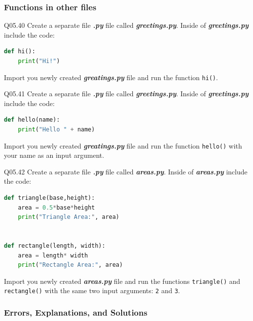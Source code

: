 \documentclass{book}
\newenvironment{problems}{}{}  %
\begin{document}
    
        \begin{problems}
        \subsubsection{Functions in other files}\label{functions-in-other-files}

Q05.40 Create a separate file \textbf{\emph{.py}} file called
\textbf{\emph{greetings.py}}. Inside of \textbf{\emph{greetings.py}}
include the code:

\begin{lstlisting}[language=Python]
def hi():
    print("Hi!")
\end{lstlisting}

Import you newly created \textbf{\emph{greatings.py}} file and run the
function \lstinline!hi()!.

Q05.41 Create a separate file \textbf{\emph{.py}} file called
\textbf{\emph{greetings.py}}. Inside of \textbf{\emph{greetings.py}}
include the code:

\begin{lstlisting}[language=Python]
def hello(name):
    print("Hello " + name)
\end{lstlisting}

Import you newly created \textbf{\emph{greatings.py}} file and run the
function \lstinline!hello()! with your name as an input argument.

Q05.42 Create a separate file \textbf{\emph{.py}} file called
\textbf{\emph{areas.py}}. Inside of \textbf{\emph{areas.py}} include the
code:

\begin{lstlisting}[language=Python]
def triangle(base,height):
    area = 0.5*base*height
    print("Triangle Area:", area)
    

def rectangle(length, width):
    area = length* width
    print("Rectangle Area:", area)
\end{lstlisting}

Import you newly created \textbf{\emph{areas.py}} file and run the
functions \lstinline!triangle()! and \lstinline!rectangle()! with the
same two input arguments: \lstinline!2! and \lstinline!3!.
        \end{problems}

    




    
        \subsubsection{Errors, Explanations, and
Solutions}\label{errors-explanations-and-solutions}
\end{document}
